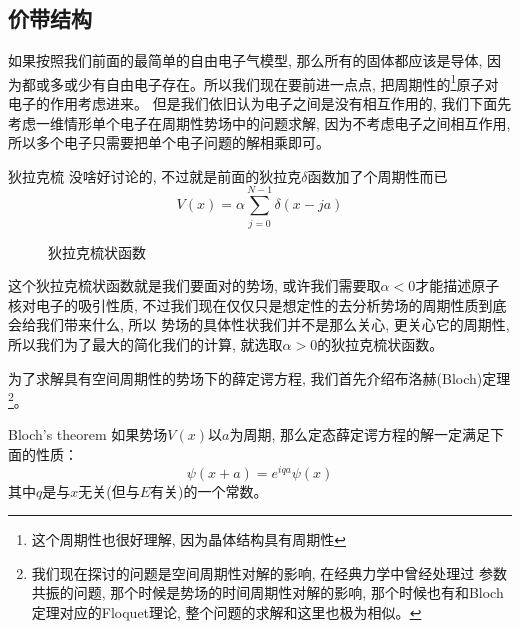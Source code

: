 \documentclass[a4paper,zihao=-4,linespread=1]{ctexrep}
\begin{document}
    \subsection{价带结构}
    如果按照我们前面的最简单的自由电子气模型, 那么所有的固体都应该是导体, 因为都或多或少有自由电子存在。所以我们现在要前进一点点, 把周期性的\footnote{这个周期性也很好理解, 因为晶体结构具有周期性}原子对电子的作用考虑进来。
    但是我们依旧认为电子之间是没有相互作用的, 我们下面先考虑一维情形单个电子在周期性势场中的问题求解, 因为不考虑电子之间相互作用, 所以多个电子只需要把单个电子问题的解相乘即可。
    \begin{define}{狄拉克梳}
        没啥好讨论的, 不过就是前面的狄拉克$\delta$函数加了个周期性而已
        \begin{equation}
            V(x)=\alpha \sum_{j=0}^{N-1} \delta(x-j a)
        \end{equation}
    \end{define}
    \begin{figure}
        \centering
        \caption{狄拉克梳状函数}
        \label{fig:5.4}
    \end{figure}
    这个狄拉克梳状函数就是我们要面对的势场, 或许我们需要取$\alpha<0$才能描述原子核对电子的吸引性质, 不过我们现在仅仅只是想定性的去分析势场的周期性质到底会给我们带来什么, 所以
    势场的具体性状我们并不是那么关心, 更关心它的周期性, 所以我们为了最大的简化我们的计算, 就选取$\alpha>0$的狄拉克梳状函数。

    为了求解具有空间周期性的势场下的薛定谔方程, 我们首先介绍布洛赫(Bloch)定理\footnote{我们现在探讨的问题是空间周期性对解的影响, 在经典力学中曾经处理过
    参数共振的问题, 那个时候是势场的时间周期性对解的影响, 那个时候也有和Bloch定理对应的Floquet理论, 整个问题的求解和这里也极为相似。}。
    \begin{theorem}{Bloch's theorem}
        如果势场$V(x)$以$a$为周期, 那么定态薛定谔方程的解一定满足下面的性质：
        \begin{equation}
            \label{eq:5.34}
            \boxed{
                \psi(x+a)=e^{iqa}\psi(x)
            }
        \end{equation}
        其中$q$是与$x$无关(但与$E$有关)的一个常数。
    \end{theorem}
\end{document}
